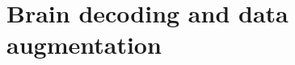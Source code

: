 \documentclass{report}
\newtheorem{prop}{Prop.}
\begin{document}
{%

\chapter{Brain decoding and data augmentation}

}
\end{document}
